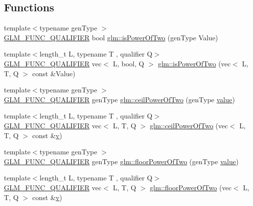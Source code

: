 \subsection*{Functions}
\begin{DoxyCompactItemize}
\item 
{\footnotesize template$<$typename gen\+Type $>$ }\\\mbox{\hyperlink{setup_8hpp_a33fdea6f91c5f834105f7415e2a64407}{G\+L\+M\+\_\+\+F\+U\+N\+C\+\_\+\+Q\+U\+A\+L\+I\+F\+I\+ER}} bool \mbox{\hyperlink{namespaceglm_a2e60d24d864637d3ebd62e6fa4941613}{glm\+::is\+Power\+Of\+Two}} (gen\+Type Value)
\item 
{\footnotesize template$<$length\+\_\+t L, typename T , qualifier Q$>$ }\\\mbox{\hyperlink{setup_8hpp_a33fdea6f91c5f834105f7415e2a64407}{G\+L\+M\+\_\+\+F\+U\+N\+C\+\_\+\+Q\+U\+A\+L\+I\+F\+I\+ER}} vec$<$ L, bool, Q $>$ \mbox{\hyperlink{group__gtc__round_gabf2b61ded7049bcb13e25164f832a290}{glm\+::is\+Power\+Of\+Two}} (vec$<$ L, T, Q $>$ const \&Value)
\item 
{\footnotesize template$<$typename gen\+Type $>$ }\\\mbox{\hyperlink{setup_8hpp_a33fdea6f91c5f834105f7415e2a64407}{G\+L\+M\+\_\+\+F\+U\+N\+C\+\_\+\+Q\+U\+A\+L\+I\+F\+I\+ER}} gen\+Type \mbox{\hyperlink{namespaceglm_a15ad0f1b70561471f34bc2e43469424e}{glm\+::ceil\+Power\+Of\+Two}} (gen\+Type \mbox{\hyperlink{_s_d_l__opengl__glext_8h_a8ad81492d410ff2ac11f754f4042150f}{value}})
\item 
{\footnotesize template$<$length\+\_\+t L, typename T , qualifier Q$>$ }\\\mbox{\hyperlink{setup_8hpp_a33fdea6f91c5f834105f7415e2a64407}{G\+L\+M\+\_\+\+F\+U\+N\+C\+\_\+\+Q\+U\+A\+L\+I\+F\+I\+ER}} vec$<$ L, T, Q $>$ \mbox{\hyperlink{group__gtc__round_gab53d4a97c0d3e297be5f693cdfdfe5d2}{glm\+::ceil\+Power\+Of\+Two}} (vec$<$ L, T, Q $>$ const \&\mbox{\hyperlink{_s_d_l__opengl_8h_a10a82eabcb59d2fcd74acee063775f90}{v}})
\item 
{\footnotesize template$<$typename gen\+Type $>$ }\\\mbox{\hyperlink{setup_8hpp_a33fdea6f91c5f834105f7415e2a64407}{G\+L\+M\+\_\+\+F\+U\+N\+C\+\_\+\+Q\+U\+A\+L\+I\+F\+I\+ER}} gen\+Type \mbox{\hyperlink{namespaceglm_ac1385510b859757901e927c43bf4f329}{glm\+::floor\+Power\+Of\+Two}} (gen\+Type \mbox{\hyperlink{_s_d_l__opengl__glext_8h_a8ad81492d410ff2ac11f754f4042150f}{value}})
\item 
{\footnotesize template$<$length\+\_\+t L, typename T , qualifier Q$>$ }\\\mbox{\hyperlink{setup_8hpp_a33fdea6f91c5f834105f7415e2a64407}{G\+L\+M\+\_\+\+F\+U\+N\+C\+\_\+\+Q\+U\+A\+L\+I\+F\+I\+ER}} vec$<$ L, T, Q $>$ \mbox{\hyperlink{group__gtc__round_gaf0d591a8fca8ddb9289cdeb44b989c2d}{glm\+::floor\+Power\+Of\+Two}} (vec$<$ L, T, Q $>$ const \&\mbox{\hyperlink{_s_d_l__opengl_8h_a10a82eabcb59d2fcd74acee063775f90}{v}})

\end{DoxyCompactItemize}
